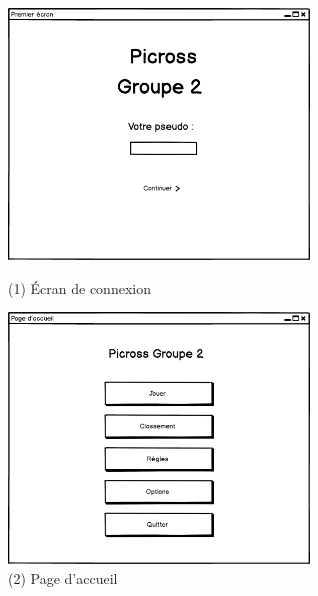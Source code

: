\documentclass{report}
\begin{document}
		
	\begin{figure}[H]
    		\begin{minipage}[c]{.46\linewidth}
       			\centering
       			\includegraphics[width=8cm]{Maquettes/Premier_ecran.png}
        			\caption{(1) Écran de connexion}
    		\end{minipage}
    		\hfill
   		\begin{minipage}[c]{.46\linewidth}
        			\centering
       			 \includegraphics[width=8cm]{Maquettes/Page_Accueil.png}
        			\caption{(2) Page d'accueil}
    		\end{minipage}
	\end{figure}
	
\end{document}
